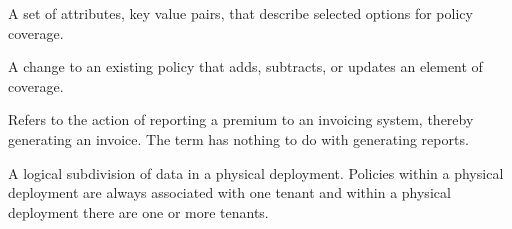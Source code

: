 %
%


 A set of attributes, key value pairs, that describe selected options for policy coverage.

 A change to an existing policy that adds, subtracts, or updates an element of coverage.

 Refers to the action of reporting a premium to an invoicing system, thereby generating an invoice. The term has nothing to do with generating reports.

 A logical subdivision of data in a physical deployment. Policies within a physical deployment are always associated with
one tenant and within a physical deployment there are one or more tenants.
